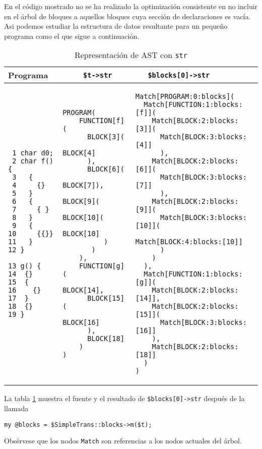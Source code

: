 En el código mostrado no se ha realizado la optimización
consistente en no incluir en el árbol de bloques
a aquellos bloques cuya sección de declaraciones es vacía.
Asi podemos estudiar la estructura de datos resultante
para un pequeño programa como el que sigue a continuación.


\begin{table}[hbt]
\begin{center}
\caption{Representación de AST con {\tt str}}
\label{table:programandhierarchy}
\begin{tabular}{|p{3cm}|p{4cm}|p{7cm}|}
\hline
Programa & \verb|     $t->str| & \verb|   $blocks[0]->str|\\
\hline
\begin{verbatim}
 1 char d0; 
 2 char f() {
 3   {
 4     {}
 5   }
 6   {
 7     { }
 8   }
 9   {
10     {{}}
11   }
12 }

13 g() {
14  {}
15  {
16    {}
17  }
18  {}
19 }
\end{verbatim}
&
\begin{verbatim}
PROGRAM(
    FUNCTION[f](
      BLOCK[3](
        BLOCK[4]
      ),
      BLOCK[6](
        BLOCK[7]),
        BLOCK[9](
          BLOCK[10](
            BLOCK[10]
          )
       )
    ),
    FUNCTION[g](
      BLOCK[14],
      BLOCK[15](
        BLOCK[16]
      ),
      BLOCK[18]
    )
)
\end{verbatim}
&
\begin{verbatim}
Match[PROGRAM:0:blocks](
  Match[FUNCTION:1:blocks:[f]](
    Match[BLOCK:2:blocks:[3]](
      Match[BLOCK:3:blocks:[4]]
      ),
    Match[BLOCK:2:blocks:[6]](
      Match[BLOCK:3:blocks:[7]]
      ),
    Match[BLOCK:2:blocks:[9]](
      Match[BLOCK:3:blocks:[10]](
        Match[BLOCK:4:blocks:[10]]
      )
    )
  ),
  Match[FUNCTION:1:blocks:[g]](
    Match[BLOCK:2:blocks:[14]],
    Match[BLOCK:2:blocks:[15]](
      Match[BLOCK:3:blocks:[16]]
    ),
    Match[BLOCK:2:blocks:[18]]
  )
)
\end{verbatim}\\
\hline
\end{tabular}
\end{center}
\end{table}

La tabla 
\ref{table:programandhierarchy}
muestra el fuente y el resultado de \verb|$blocks[0]->str|
después de la llamada

\verb|my @blocks = $SimpleTrans::blocks->m($t);|

Obsérvese que los nodos \verb|Match| son referencias 
a los nodos actuales del árbol.

